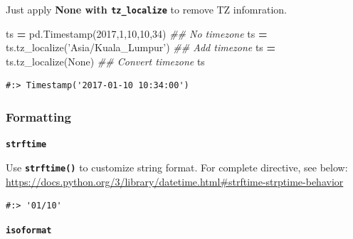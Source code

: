 \documentclass[
]{book}
\newenvironment{Shaded}{\begin{snugshade}}{\end{snugshade}}
\newcommand{\CommentTok}[1]{\textcolor[rgb]{0.37,0.37,0.37}{\textit{#1}}}
\newcommand{\DecValTok}[1]{\textcolor[rgb]{0.06,0.06,0.06}{#1}}
\newcommand{\NormalTok}[1]{#1}
\newcommand{\OperatorTok}[1]{\textcolor[rgb]{0.43,0.43,0.43}{\textbf{#1}}}
\newcommand{\SpecialCharTok}[1]{\textcolor[rgb]{0,0,0}{#1}}
\newcommand{\StringTok}[1]{\textcolor[rgb]{0.5,0.5,0.5}{#1}}
\newcommand{\VariableTok}[1]{\textcolor[rgb]{0,0,0}{#1}}
\begin{document}
Just apply \textbf{None with \texttt{tz\_localize}} to remove TZ infomration.

\begin{Shaded}
\begin{Highlighting}[]
\NormalTok{ts }\OperatorTok{=}\NormalTok{ pd.Timestamp(}\DecValTok{2017}\NormalTok{,}\DecValTok{1}\NormalTok{,}\DecValTok{10}\NormalTok{,}\DecValTok{10}\NormalTok{,}\DecValTok{34}\NormalTok{)        }\CommentTok{## No timezone}
\NormalTok{ts }\OperatorTok{=}\NormalTok{ ts.tz_localize(}\StringTok{'Asia/Kuala_Lumpur'}\NormalTok{)  }\CommentTok{## Add timezone}
\NormalTok{ts }\OperatorTok{=}\NormalTok{ ts.tz_localize(}\VariableTok{None}\NormalTok{)                 }\CommentTok{## Convert timezone}
\NormalTok{ts}
\end{Highlighting}
\end{Shaded}

\begin{verbatim}
#:> Timestamp('2017-01-10 10:34:00')
\end{verbatim}

\hypertarget{formatting}{%
\subsubsection{Formatting}\label{formatting}}

\textbf{\texttt{strftime}}

Use \textbf{\texttt{strftime()}} to customize string format. For complete directive, see below: \url{https://docs.python.org/3/library/datetime.html\#strftime-strptime-behavior}

\begin{Shaded}
\end{Shaded}

\begin{verbatim}
#:> '01/10'
\end{verbatim}

\textbf{\texttt{isoformat}}
\end{document}
